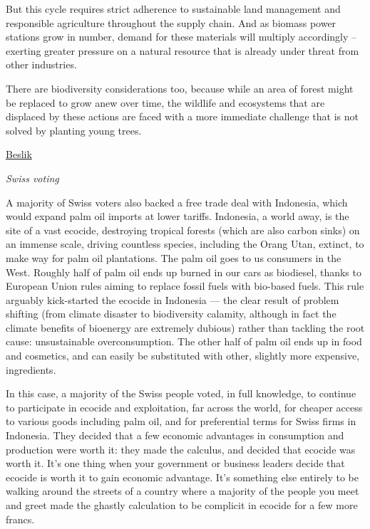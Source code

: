 \documentclass[
]{book}
\begin{document}
But this cycle requires strict adherence to sustainable land management and responsible agriculture throughout the supply chain. And as biomass power stations grow in number, demand for these materials will multiply accordingly -- exerting greater pressure on a natural resource that is already under threat from other industries.

There are biodiversity considerations too, because while an area of forest might be replaced to grow anew over time, the wildlife and ecosystems that are displaced by these actions are faced with a more immediate challenge that is not solved by planting young trees.

\href{https://esgonasunday.substack.com/p/week-18-is-biomass-an-energy-source}{Beslik}

\emph{Swiss voting}

A majority of Swiss voters also backed a free trade deal with Indonesia, which would expand palm oil imports at lower tariffs. Indonesia, a world away, is the site of a vast ecocide, destroying tropical forests (which are also carbon sinks) on an immense scale, driving countless species, including the Orang Utan, extinct, to make way for palm oil plantations. The palm oil goes to us consumers in the West. Roughly half of palm oil ends up burned in our cars as biodiesel, thanks to European Union rules aiming to replace fossil fuels with bio-based fuels. This rule arguably kick-started the ecocide in Indonesia --- the clear result of problem shifting (from climate disaster to biodiversity calamity, although in fact the climate benefits of bioenergy are extremely dubious) rather than tackling the root cause: unsustainable overconsumption. The other half of palm oil ends up in food and cosmetics, and can easily be substituted with other, slightly more expensive, ingredients.

In this case, a majority of the Swiss people voted, in full knowledge, to continue to participate in ecocide and exploitation, far across the world, for cheaper access to various goods including palm oil, and for preferential terms for Swiss firms in Indonesia. They decided that a few economic advantages in consumption and production were worth it: they made the calculus, and decided that ecocide was worth it. It's one thing when your government or business leaders decide that ecocide is worth it to gain economic advantage. It's something else entirely to be walking around the streets of a country where a majority of the people you meet and greet made the ghastly calculation to be complicit in ecocide for a few more francs.
\end{document}
